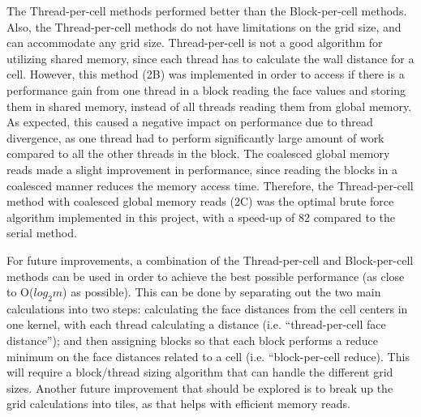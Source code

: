 \documentclass[]{aiaa-tc}%
\begin{document}
The Thread-per-cell methods performed better than the Block-per-cell
methods.  Also, the Thread-per-cell methods do not have limitations on
the grid size, and can accommodate any grid size.  Thread-per-cell is
not a good algorithm for utilizing shared memory, since each thread
has to calculate the wall distance for a cell.  However, this method
(2B) was implemented in order to access if there is a performance gain
from one thread in a block reading the face values and storing them in
shared memory, instead of all threads reading them from global memory.
As expected, this caused a negative impact on performance due to
thread divergence, as one thread had to perform significantly large
amount of work compared to all the other threads in the block.  The
coalesced global memory reads made a slight improvement in
performance, since reading the blocks in a coalesced manner reduces
the memory access time.  Therefore, the Thread-per-cell method with
coalesced global memory reads (2C) was the optimal brute force
algorithm implemented in this project, with a speed-up of 82 compared
to the serial method.


For future improvements, a combination of the Thread-per-cell and
Block-per-cell methods can be used in order to achieve the best
possible performance (as close to O($log_2 m$) as possible).  This can be
done by separating out the two main calculations into two steps:
calculating the face distances from the cell centers in one kernel,
with each thread calculating a distance (i.e. “thread-per-cell face
distance”); and then assigning blocks so that each block performs a
reduce minimum on the face distances related to a cell
(i.e. “block-per-cell reduce).  This will require a block/thread
sizing algorithm that can handle the different grid sizes.  Another
future improvement that should be explored is to break up the grid
calculations into tiles, as that helps with efficient memory reads. 
\end{document}

